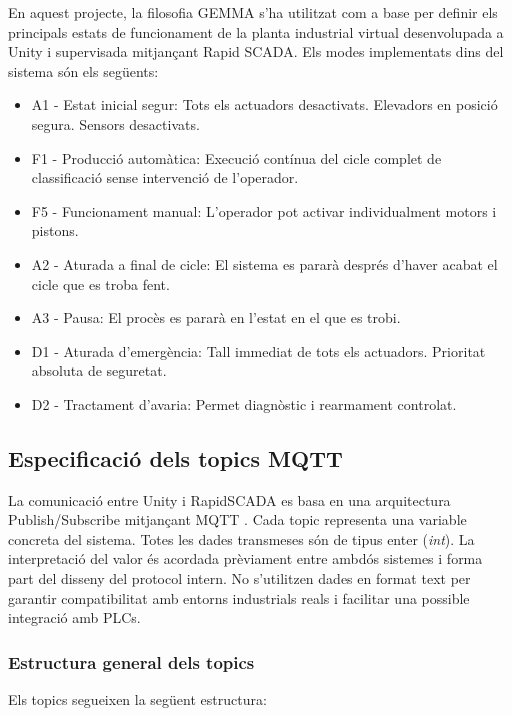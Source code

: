 \documentclass[a4paper,11pt,DIV=13,headings=normal,abstract=true,twoside=semi]{article}
\begin{document}
En aquest projecte, la filosofia GEMMA s'ha utilitzat com a base per definir els principals estats de funcionament de la planta industrial virtual desenvolupada a Unity i supervisada mitjançant Rapid SCADA. Els modes implementats dins del sistema són els següents:
\begin{itemize}
\item A1 - Estat inicial segur: Tots els actuadors desactivats. Elevadors en posició segura. Sensors desactivats.

\item F1 - Producció automàtica: Execució contínua del cicle complet de classificació sense intervenció de l'operador.

\item F5 - Funcionament manual: L'operador pot activar individualment motors i pistons.

\item A2 - Aturada a final de cicle: El sistema es pararà després d'haver acabat el cicle que es troba fent.
\item A3 - Pausa: El procès es pararà en l'estat en el que es trobi.
\item D1 - Aturada d'emergència: Tall immediat de tots els actuadors. Prioritat absoluta de seguretat.

\item D2 - Tractament d'avaria: Permet diagnòstic i rearmament controlat.
\end{itemize}

\subsection{Especificació dels topics MQTT}

La comunicació entre Unity i RapidSCADA es basa en una arquitectura Publish/Subscribe mitjançant MQTT \cite{Team2015MQTT}. Cada topic representa una variable concreta del sistema. Totes les dades transmeses són de tipus enter (\textit{int}). La interpretació del valor és acordada prèviament entre ambdós sistemes i forma part del disseny del protocol intern. No s'utilitzen dades en format text per garantir compatibilitat amb entorns industrials reals i facilitar una possible integració amb PLCs.
\subsubsection{Estructura general dels topics}

Els topics segueixen la següent estructura:
\end{document}

